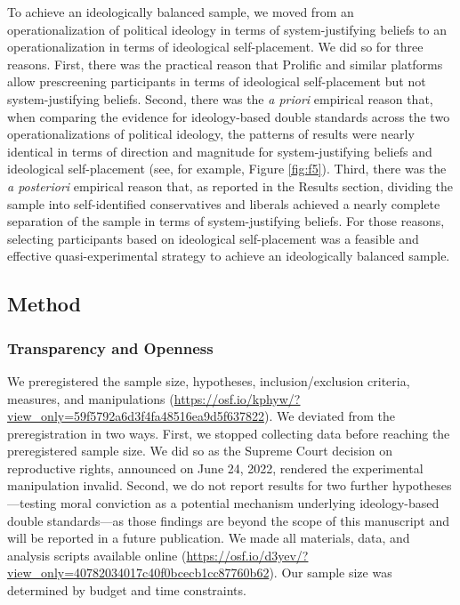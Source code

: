 \documentclass[12pt, letterpaper]{article}
\begin{document}
To achieve an ideologically balanced sample, we moved from an
operationalization of political ideology in terms of system-justifying
beliefs to an operationalization in terms of ideological self-placement.
We did so for three reasons. First, there was the practical reason that
Prolific and similar platforms allow prescreening participants in terms
of ideological self-placement but not system-justifying beliefs. Second,
there was the \emph{a priori} empirical reason that, when comparing the
evidence for ideology-based double standards across the two
operationalizations of political ideology, the patterns of results were
nearly identical in terms of direction and magnitude for
system-justifying beliefs and ideological self-placement (see, for
example, Figure \ref{fig:f5}). Third, there was the \emph{a posteriori}
empirical reason that, as reported in the Results section, dividing the
sample into self-identified conservatives and liberals achieved a nearly
complete separation of the sample in terms of system-justifying beliefs.
For those reasons, selecting participants based on ideological
self-placement was a feasible and effective quasi-experimental strategy
to achieve an ideologically balanced sample.

\hypertarget{method-2}{%
\subsection{Method}\label{method-2}}

\hypertarget{transparency-and-openness-2}{%
\subsubsection{Transparency and
Openness}\label{transparency-and-openness-2}}

We preregistered the sample size, hypotheses, inclusion/exclusion
criteria, measures, and manipulations
(\url{https://osf.io/kphyw/?view_only=59f5792a6d3f4fa48516ea9d5f637822}).
We deviated from the preregistration in two ways. First, we stopped
collecting data before reaching the preregistered sample size. We did so
as the Supreme Court decision on reproductive rights, announced on June
24, 2022, rendered the experimental manipulation invalid. Second, we do
not report results for two further hypotheses---testing moral conviction
as a potential mechanism underlying ideology-based double standards---as
those findings are beyond the scope of this manuscript and will be
reported in a future publication. We made all materials, data, and
analysis scripts available online
(\url{https://osf.io/d3yev/?view_only=40782034017c40f0bcecb1cc87760b62}).
Our sample size was determined by budget and time constraints.
\end{document}
